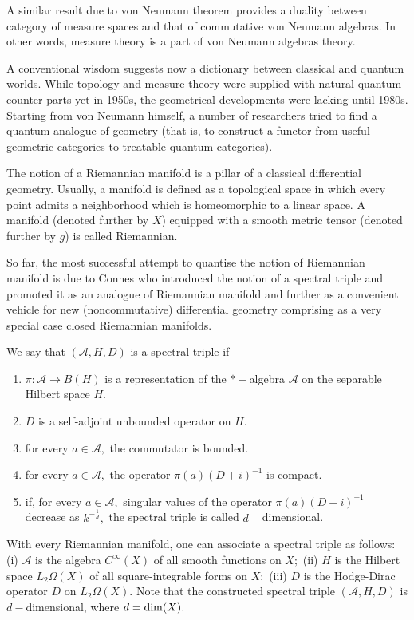 \documentclass{article}
\begin{document}
A similar result due to von Neumann theorem provides a duality between category of measure spaces and that of commutative von Neumann algebras. In other words, measure theory is a part of von Neumann algebras theory.

A conventional wisdom suggests now a dictionary between classical and quantum worlds.  While topology and measure theory were supplied with natural quantum counter-parts yet in 1950s, the geometrical developments were lacking until 1980s. Starting from von Neumann himself, a number of researchers tried to find a quantum analogue of geometry (that is, to construct a functor from useful geometric categories to treatable quantum categories).

The notion of a Riemannian manifold is a pillar of a classical differential geometry. Usually, a manifold is defined as a topological space in which every point admits a neighborhood which is homeomorphic to a linear space. A manifold (denoted further by $X$) equipped with a smooth metric tensor (denoted further by $g$) is called Riemannian.

So far, the most successful attempt to quantise the notion of Riemannian manifold is due to Connes who introduced the notion of a spectral triple and promoted it as an analogue of Riemannian manifold and further as a convenient vehicle for new (noncommutative) differential geometry comprising as a very special case closed Riemannian manifolds.  

We say that $(\mathcal{A},H,D)$ is a spectral triple if
\begin{enumerate}
\item $\pi:\mathcal{A}\to B(H)$ is a representation of the $\ast-$algebra $\mathcal{A}$ on the separable Hilbert space $H.$
\item $D$ is a self-adjoint unbounded operator on $H.$
\item for every $a\in\mathcal{A},$ the commutator is bounded.
\item for every $a\in\mathcal{A},$ the operator $\pi(a)(D+i)^{-1}$ is compact.
\item if, for every $a\in\mathcal{A},$ singular values of the operator $\pi(a)(D+i)^{-1}$ decrease as $k^{-\frac1d},$ the spectral triple is called $d-$dimensional.
\end{enumerate}

With every Riemannian manifold, one can associate a spectral triple as follows: (i) $\mathcal{A}$ is the algebra $C^{\infty}(X)$ of all smooth functions on $X;$ (ii) $H$ is the Hilbert space $L_2\Omega(X)$ of all square-integrable forms on $X;$ (iii) $D$ is the Hodge-Dirac operator $D$ \cite{BGV} on $L_2\Omega(X).$ Note that the constructed spectral triple $(\mathcal{A},H,D)$ is $d-$dimensional, where $d={\rm dim}(X).$
\end{document}
